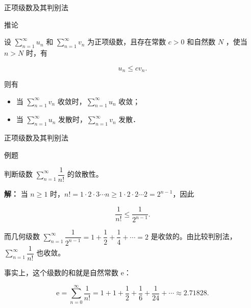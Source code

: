 \documentclass[aspectratio=169,10pt,fontset=fandol]{ctexbeamer}
\newcommand{\ee}{\mathrm{e}}
\begin{document}
\begin{frame}[t,fragile]{正项级数及其判别法}
\normalsize
\begin{block}{推论}
{\normalsize
设 $\sum\limits_{n = 1}^{  \infty } u_n$ 和 $\sum\limits_{n = 1}^{  \infty } v_n$ 为正项级数，且存在常数 $c>0$ 和自然数 $N$ ，使当$n>N$ 时，有

	

	$$

	u_n \leqslant c v_n .

	$$

	

	则有

	\begin{itemize}

		\item[（1）] 当 $\sum\limits_{n = 1}^{  \infty } v_n$ 收敛时，$\sum\limits_{n = 1}^{  \infty } u_n$ 收敛；

		\item[（2）] 当 $\sum\limits_{n = 1}^{  \infty } u_n$ 发散时，$\sum\limits_{n = 1}^{  \infty } v_n$ 发散．

	\end{itemize}


}
\end{block}
\end{frame}
\begin{frame}[t,fragile]{正项级数及其判别法}
\normalsize
\begin{block}{例题}
{\normalsize
判断级数 \(\sum\limits_{n = 1}^{  \infty } \dfrac{1}{n!}\) 的敛散性。


}
\end{block}
\pause
{\normalsize
\textbf{解：}
当 \(n \geq 1\) 时，\(n! = 1 \cdot 2 \cdot 3 \cdots n \geq 1 \cdot 2 \cdot 2 \cdots 2 = 2^{n-1}\)，因此

\[

\dfrac{1}{n!} \leq \dfrac{1}{2^{n-1}}.

\]



而几何级数 \(\sum\limits_{n = 1}^{  \infty } \dfrac{1}{2^{n-1}} = 1 + \dfrac12 + \dfrac14 + \cdots = 2\) 是收敛的。由比较判别法，\(\sum\limits_{n = 1}^{  \infty } \dfrac{1}{n!}\) 也收敛。



事实上，这个级数的和就是自然常数 \(\ee\)：

\[

\ee = \sum_{n=0}^{\infty} \dfrac{1}{n!} = 1 + 1 + \dfrac12 + \dfrac16 + \dfrac{1}{24} + \cdots \approx 2.71828.

\]


}
\end{frame}
\end{document}
